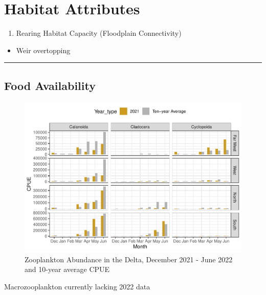 \documentclass[
]{book}
\providecommand{\tightlist}{%
  \setlength{\itemsep}{0pt}\setlength{\parskip}{0pt}}
\theoremstyle{definition}
\theoremstyle{definition}
\theoremstyle{definition}
\theoremstyle{definition}
\theoremstyle{remark}
\begin{document}
\hypertarget{habitat-attributes-3}{%
\section{Habitat Attributes}\label{habitat-attributes-3}}

\begin{enumerate}
\def\labelenumi{\arabic{enumi}.}
\tightlist
\item
  Rearing Habitat Capacity (Floodplain Connectivity)
\end{enumerate}

\begin{itemize}
\tightlist
\item
  Weir overtopping
\end{itemize}

\begin{center}\rule{0.5\linewidth}{0.5pt}\end{center}

\hypertarget{food-availability}{%
\subsection{Food Availability}\label{food-availability}}

\begin{figure}
\centering
\includegraphics{_main_files/figure-latex/meso-fig-1.pdf}
\caption{\label{fig:meso-fig}Zooplankton Abundance in the Delta, December 2021 - June 2022 and 10-year average CPUE}
\end{figure}

Macrozooplankton currently lacking 2022 data
\end{document}
